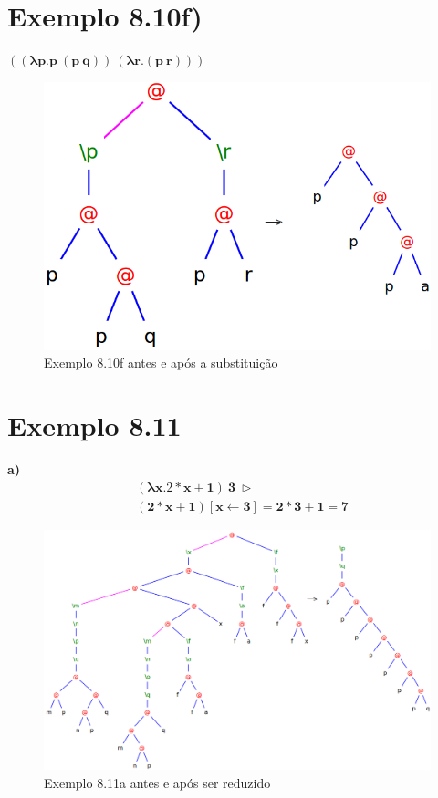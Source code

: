 \documentclass[a4paper]{article}
\begin{document}
\FloatBarrier

\section*{Exemplo 8.10f)}

$\mathbf{((\lambda p.p\ (p\ q))\ (\lambda r.(p\ r)))}$

\begin{figure}[h]
  \centering
  \includegraphics[scale=0.4]{8-10f.png}
  \caption{Exemplo 8.10f antes e após a substituição}
\end{figure}

\FloatBarrier

\section*{Exemplo 8.11}
\textbf{a)}
\begin{align*}
&\mathbf{(\lambda x.2 * x + 1)\ 3\ \rhd} \\
&\mathbf{(2 * x + 1) [x \leftarrow 3] = 2*3 + 1 = 7}
\end{align*}

\begin{figure}[h]
  \centering
  \includegraphics[scale=0.5]{8-11a_1.png}
  \caption{Exemplo 8.11a antes e após ser reduzido}
\end{figure}
\end{document}
